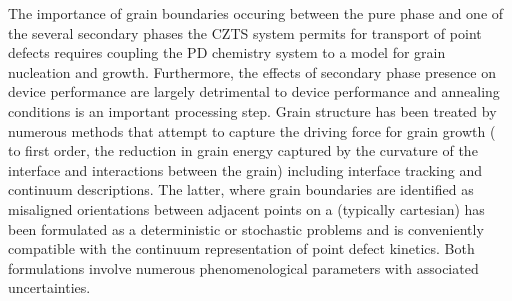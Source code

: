 \documentclass[11pt]{article}
\newcommand{\MarginPar}[1]{\marginpar{%
\vskip-\baselineskip %
\raggedright\tiny\sffamily
\hrule\smallskip{\color{red}#1}\par\smallskip\hrule}}
\begin{document}
The importance of grain boundaries occuring between the pure phase and one of the several secondary phases the CZTS system permits for transport of point defects requires coupling the PD chemistry system to a model for
grain nucleation and growth. 
Furthermore, the effects of 
secondary phase presence on device performance are largely detrimental to device
performance \cite{Flammersberger} and annealing conditions is an important processing step.  Grain structure has been treated by numerous methods that attempt to capture the driving force for grain growth ( to first order, the reduction in grain energy captured by the curvature of the interface and interactions between the grain) including interface tracking and continuum descriptions. The latter, where grain boundaries are identified as misaligned orientations between adjacent points on a (typically cartesian) has been formulated as a deterministic \cite{FanGC97} or stochastic \cite{Rollett04} problems and is conveniently compatible with the continuum representation of point defect kinetics.  Both formulations involve numerous phenomenological parameters with associated uncertainties. 
%
\end{document}
